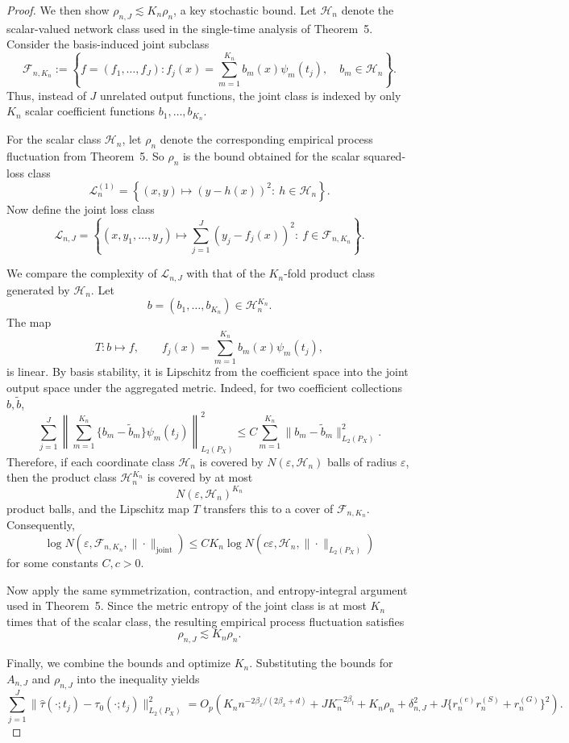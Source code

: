 \documentclass{article}
\newenvironment{proofof}[1]
{\renewcommand{\proofname}{Proof of #1}\begin{proof}}
{\end{proof}}
\begin{document}
\begin{proofof}{Theorem \ref{thm:joint_pseudo}:}
We then show \(\rho_{n,J}\lesssim K_n\rho_n\),
a key stochastic bound. Let \(\mathcal H_n\) denote the scalar-valued network class used in the single-time analysis of Theorem~5. Consider the basis-induced joint subclass
\[
\mathcal F_{n,K_n}
:=
\left\{
f=(f_1,\ldots,f_J):
f_j(x)=\sum_{m=1}^{K_n} b_m(x)\psi_m(t_j),\quad b_m\in\mathcal H_n
\right\}.
\]
Thus, instead of \(J\) unrelated output functions, the joint class is indexed by only
\(K_n\) scalar coefficient functions \(b_1,\ldots,b_{K_n}\).

For the scalar class \(\mathcal H_n\), let \(\rho_n\) denote the corresponding empirical process fluctuation from Theorem~5. So \(\rho_n\) is the bound obtained for the scalar squared-loss class
\[
\mathcal L_n^{(1)}
=
\left\{
(x,y)\mapsto (y-h(x))^2:\ h\in\mathcal H_n
\right\}.
\]
Now define the joint loss class
\[
\mathcal L_{n,J}
=
\left\{
(x,y_1,\ldots,y_J)\mapsto
\sum_{j=1}^J (y_j-f_j(x))^2:\ f\in\mathcal F_{n,K_n}
\right\}.
\]

We compare the complexity of \(\mathcal L_{n,J}\) with that of the \(K_n\)-fold product class generated by \(\mathcal H_n\). Let
\[
b=(b_1,\ldots,b_{K_n})\in\mathcal H_n^{K_n}.
\]
The map
\[
T:b\mapsto f,
\qquad
f_j(x)=\sum_{m=1}^{K_n} b_m(x)\psi_m(t_j),
\]
is linear. By basis stability, it is Lipschitz from the coefficient space into the joint output space under the aggregated metric. Indeed, for two coefficient collections \(b,\tilde b\),
\[
\sum_{j=1}^J
\left\|
\sum_{m=1}^{K_n}\{b_m-\tilde b_m\}\psi_m(t_j)
\right\|_{L_2(P_X)}^2
\le
C\sum_{m=1}^{K_n}\|b_m-\tilde b_m\|_{L_2(P_X)}^2.
\]
Therefore, if each coordinate class \(\mathcal H_n\) is covered by \(N(\varepsilon,\mathcal H_n)\) balls of radius \(\varepsilon\), then the product class \(\mathcal H_n^{K_n}\) is covered by at most
\[
N(\varepsilon,\mathcal H_n)^{K_n}
\]
product balls, and the Lipschitz map \(T\) transfers this to a cover of \(\mathcal F_{n,K_n}\). Consequently,
\[
\log N(\varepsilon,\mathcal F_{n,K_n},\|\cdot\|_{\mathrm{joint}})
\le
C K_n \log N(c\varepsilon,\mathcal H_n,\|\cdot\|_{L_2(P_X)})
\]
for some constants \(C,c>0\).

Now apply the same symmetrization, contraction, and entropy-integral argument used in Theorem~5. Since the metric entropy of the joint class is at most \(K_n\) times that of the scalar class, the resulting empirical process fluctuation satisfies
\[
\rho_{n,J}\lesssim K_n\rho_n.
\]


Finally, we combine the bounds and optimize \(K_n\).
Substituting the bounds for \(A_{n,J}\) and \(\rho_{n,J}\) into the inequality  yields
\[
\sum_{j=1}^J
\|\hat\tau(\cdot;t_j)-\tau_0(\cdot;t_j)\|_{L_2(P_X)}^2
=
O_p\!\left(
K_n n^{-2\beta_x/(2\beta_x+d)}
+
J K_n^{-2\beta_t}
+
K_n\rho_n
+
\delta_{n,J}^2
+
J\{r_n^{(e)}r_n^{(S)}+r_n^{(G)}\}^2
\right).
\]



\end{proofof}
\end{document}
